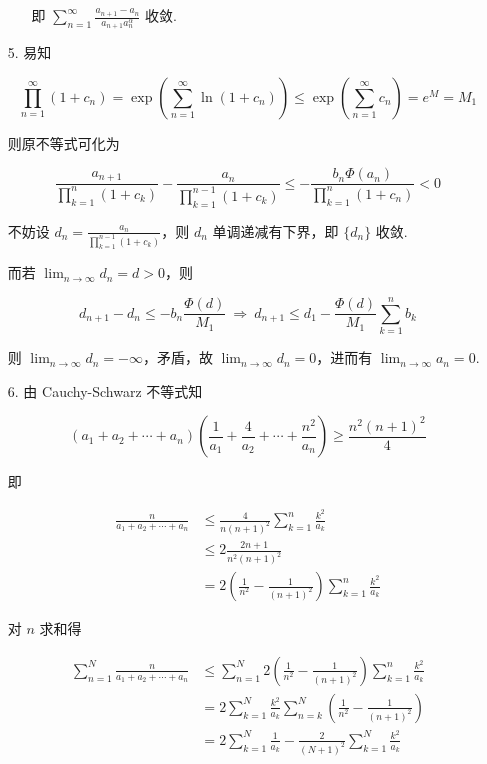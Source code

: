 \documentclass[oneside]{ctexbook} %
\begin{document}
\begin{enumerate}
\begin{enumerate}
        即 $\displaystyle \sum_{n=1}^{\infty} \frac{a_{n+1} - a_n}{a_{n+1} a_n^{\alpha}}$ 收敛.
    \end{enumerate}
    \item[5.]
    易知

    $$
    \prod_{n=1}^{\infty} (1 + c_n) = \exp\left( \sum_{n=1}^{\infty} \ln(1 + c_n) \right) \leqslant \exp\left( \sum_{n=1}^{\infty} c_n \right) = e^M = M_1
    $$

    则原不等式可化为

    $$
    \frac{a_{n+1}}{\prod_{k=1}^n (1+c_k)} - \frac{a_n}{\prod_{k=1}^{n-1} (1+c_k)} \leqslant - \frac{b_n \Phi(a_n)}{\prod_{k=1}^n (1+c_n)} < 0
    $$

    不妨设 $\displaystyle d_n = \frac{a_n}{\prod_{k=1}^{n-1} (1+c_k)}$，则 $d_n$ 单调递减有下界，即 $\{ d_n \}$ 收敛.

    而若 $\displaystyle \lim_{n \to \infty} d_n = d > 0$，则

    $$
    d_{n+1} - d_n \leqslant -b_n \frac{\Phi(d)}{M_1} \ \Rightarrow \ d_{n+1} \leqslant d_1 - \frac{\Phi(d)}{M_1} \sum_{k=1}^{n} b_k
    $$

    则 $\displaystyle \lim_{n \to \infty} d_n = -\infty$，矛盾，故 $\displaystyle \lim_{n \to \infty} d_n = 0$，进而有 $\displaystyle \lim_{n \to \infty} a_n = 0$.
    \item[6.]
    由 Cauchy-Schwarz 不等式知

    $$
    (a_1 + a_2 + \cdots + a_n)\left( \frac 1 {a_1} + \frac 4 {a_2} + \cdots + \frac{n^2}{a_n} \right) \geqslant \frac {n^2(n+1)^2} 4
    $$

    即

    $$
    \begin{aligned}
        \frac n {a_1 + a_2 + \cdots + a_n} &\leqslant \frac 4 {n(n+1)^2} \sum_{k=1}^n \frac{k^2}{a_k} \\
        &\leqslant 2 \frac{2n+1}{n^2(n+1)^2} \\
        &= 2 \left( \frac 1 {n^2} - \frac 1 {(n+1)^2} \right) \sum_{k=1}^n \frac{k^2}{a_k}
    \end{aligned}
    $$

    对 $n$ 求和得

    $$
    \begin{aligned}
        \sum_{n=1}^N \frac n {a_1 + a_2 + \cdots + a_n} &\leqslant \sum_{n=1}^N 2 \left( \frac 1 {n^2} - \frac 1 {(n+1)^2} \right) \sum_{k=1}^n \frac{k^2}{a_k} \\
        &= 2 \sum_{k=1}^N \frac{k^2}{a_k} \sum_{n=k}^N \left( \frac 1 {n^2} - \frac 1 {(n+1)^2} \right) \\
        &= 2 \sum_{k=1}^N \frac 1 {a_k} - \frac 2 {(N+1)^2} \sum_{k=1}^N \frac{k^2}{a_k}
    \end{aligned}
    $$


\end{enumerate}
\end{document}
